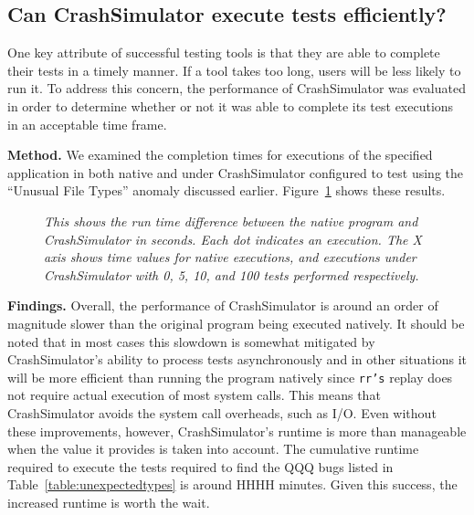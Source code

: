 \subsection{Can CrashSimulator execute tests efficiently?}
\label{sec-perf}

One key attribute of successful testing tools is that they are able to
complete their tests in a timely manner.  If a tool takes too long,
users will be less likely to run it.
To address this concern, the performance of CrashSimulator was
evaluated in order to determine whether or not it was able to complete its
test executions in an acceptable time frame.

{\bf Method.} We examined the completion
times for executions of the specified application in both
native and under CrashSimulator configured to test using the ``Unusual File
Types'' anomaly discussed earlier.
Figure~\ref{figure:performance} shows these results.

    \begin{figure}[t]
        \center{}
        \caption{\emph{This shows the run time difference between the
native program and CrashSimulator in seconds.  Each dot indicates an
        execution.  The X axis shows time values for native executions, and
        executions under CrashSimulator with 0, 5, 10, and 100 tests
        performed respectively.
}}
         \label{figure:performance}

    \end{figure}


{\bf Findings.} Overall, the performance of CrashSimulator is around
an order of magnitude slower than the original program being executed
natively.  It should be noted that in most cases
this slowdown is somewhat mitigated by CrashSimulator's ability to process
tests asynchronously and in other situations it will be more efficient than
running the program natively since {\tt rr's} replay does not require
actual execution of most system calls.  This means that CrashSimulator
avoids the system call overheads, such as I/O.
Even without these improvements, however, CrashSimulator's runtime is more
than manageable when the value it provides is taken into account.  The
cumulative runtime required to execute the tests required to find the QQQ
bugs listed in Table~\ref{table:unexpectedtypes} is around HHHH minutes.
Given this success, the increased runtime is worth the wait.
